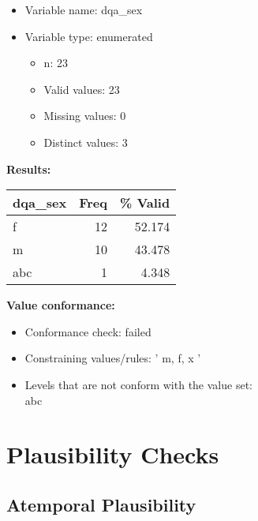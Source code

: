 \documentclass[
]{article}
\providecommand{\tightlist}{%
  \setlength{\itemsep}{0pt}\setlength{\parskip}{0pt}}
\begin{document}
\begin{itemize}
\tightlist
\item
  Variable name: dqa\_sex
\item
  Variable type: enumerated

  \begin{itemize}
  \tightlist
  \item
    n: 23
  \item
    Valid values: 23
  \item
    Missing values: 0
  \item
    Distinct values: 3
  \end{itemize}
\end{itemize}

\textbf{Results:}\\

\begin{table}[H]
\centering
\begin{tabular}{l|r|r}
\hline
\textbf{dqa\_sex} & \textbf{Freq} & \textbf{\% Valid}\\
\hline
f & 12 & 52.174\\
\hline
m & 10 & 43.478\\
\hline
abc & 1 & 4.348\\
\hline
\end{tabular}
\end{table}

\textbf{Value conformance:}

\begin{itemize}
\tightlist
\item
  Conformance check: failed
\item
  Constraining values/rules: ' m, f, x '
\item
  Levels that are not conform with the value set:\\
  abc
\end{itemize}

\newpage

\hypertarget{plausibility-checks}{%
\section{Plausibility Checks}\label{plausibility-checks}}

\hypertarget{atemporal-plausibility}{%
\subsection{Atemporal Plausibility}\label{atemporal-plausibility}}
\end{document}
